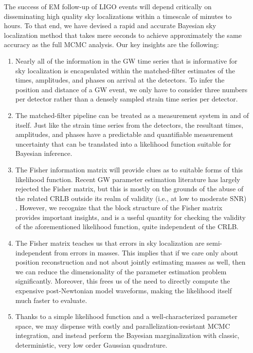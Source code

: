 \documentclass[amsmath,amssymb,aps,prx,reprint,nopreprintnumbers,nofootinbib]{revtex4-1}
\begin{document}
The success of \ac{EM} follow\nobreakdashes-up of \ac{LIGO} events will depend critically on disseminating high quality sky localizations within a timescale of minutes to hours. To that end, we have devised a rapid and accurate Bayesian sky localization method that takes mere seconds to achieve approximately the same accuracy as the full \ac{MCMC} analysis. Our key insights are the following:
%
\begin{enumerate}
    \item Nearly all of the information in the \ac{GW} time series that is informative for sky localization is encapsulated within the matched\nobreakdashes-filter estimates of the times, amplitudes, and phases on arrival at the detectors. To infer the position and distance of a \ac{GW} event, we only have to consider three numbers per detector rather than a densely sampled strain time series per detector.
    \item The matched\nobreakdashes-filter pipeline can be treated as a measurement system in and of itself. Just like the strain time series from the detectors, the resultant times, amplitudes, and phases have a predictable and quantifiable measurement uncertainty that can be translated into a likelihood function suitable for Bayesian inference.
    \item The Fisher information matrix will provide clues as to suitable forms of this likelihood function. Recent \ac{GW} parameter estimation literature has largely rejected the Fisher matrix, but this is mostly on the grounds of the abuse of the related \ac{CRLB} outside its realm of validity (i.e., at low to moderate \ac{SNR}) \cite{BayesianBounds,UseAbuseFisherMatrix,FisherMatrixAsymptoticExpansions,InadequaciesFisherMatrix}. However, we recognize that the block structure of the Fisher matrix provides important insights, and is a useful quantity for checking the validity of the aforementioned likelihood function, quite independent of the \ac{CRLB}.
    \item The Fisher matrix teaches us that errors in sky localization are semi\nobreakdashes-independent from errors in masses. This implies that if we care only about position reconstruction and not about jointly estimating masses as well, then we can reduce the dimensionality of the parameter estimation problem significantly. Moreover, this frees us of the need to directly compute the expensive post-Newtonian model waveforms, making the likelihood itself much faster to evaluate.
    \item Thanks to a simple likelihood function and a well\nobreakdashes-characterized parameter space, we may dispense with costly and parallelization\nobreakdashes-resistant \ac{MCMC} integration, and instead perform the Bayesian marginalization with classic, deterministic, very low order Gaussian quadrature.

\end{enumerate}
\end{document}
